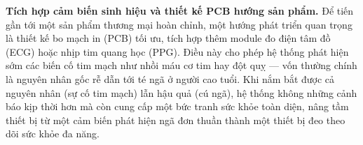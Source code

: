 \documentclass[../DoAn.tex]{subfiles}
\begin{document}
\textbf{Tích hợp cảm biến sinh hiệu và thiết kế PCB hướng sản phẩm.} Để tiến gần tới một sản phẩm thương mại hoàn chỉnh, một hướng phát triển quan trọng là thiết kế bo mạch in (PCB) tối ưu, tích hợp thêm module đo điện tâm đồ (ECG) hoặc nhịp tim quang học (PPG). Điều này cho phép hệ thống phát hiện sớm các biến cố tim mạch như nhồi máu cơ tim hay đột quỵ --- vốn thường chính là nguyên nhân gốc rễ dẫn tới té ngã ở người cao tuổi. Khi nắm bắt được cả nguyên nhân (sự cố tim mạch) lẫn hậu quả (cú ngã), hệ thống không những cảnh báo kịp thời hơn mà còn cung cấp một bức tranh sức khỏe toàn diện, nâng tầm thiết bị từ một cảm biến phát hiện ngã đơn thuần thành một thiết bị đeo theo dõi sức khỏe đa năng.
\end{document}
